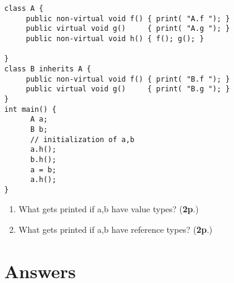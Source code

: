 \documentclass{article}
\begin{document}
\begin{enumerate}
{\small 
\begin{verbatim}
class A {
     public non-virtual void f() { print( "A.f "); }
     public virtual void g()     { print( "A.g "); }
     public non-virtual void h() { f(); g(); }
    
}
class B inherits A {
     public non-virtual void f() { print( "B.f "); }
     public virtual void g()     { print( "B.g "); }
}
int main() {
      A a;
      B b;
      // initialization of a,b
      a.h();
      b.h();
      a = b;
      a.h(); 
}
\end{verbatim}
}
\begin{enumerate}
\item What gets printed if a,b have value types?  (\textbf{2p}.)
\item What gets printed if a,b have reference types?  (\textbf{2p}.)
\end{enumerate}
\end{enumerate}

\newpage
\section*{Answers}
\end{document}
